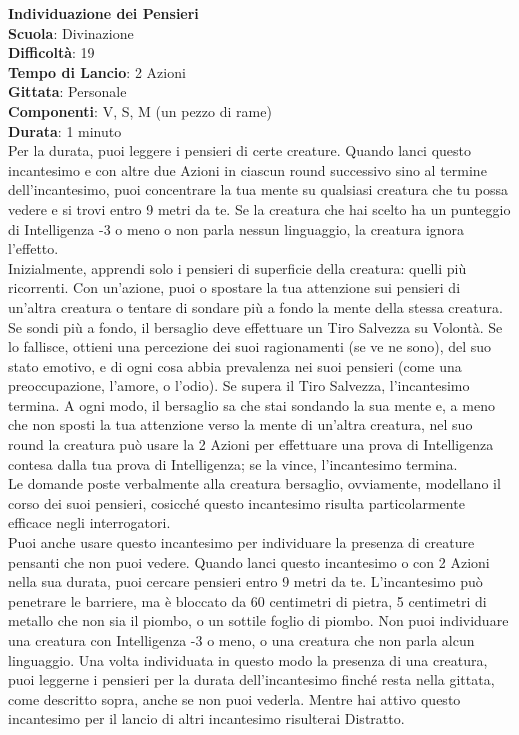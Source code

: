 \begin{multicols}{2}
\medskip\textbf{Individuazione dei Pensieri}\\
\textbf{Scuola}: Divinazione\\
\textbf{Difficoltà}: 19\\
\textbf{Tempo di Lancio}: 2 Azioni\\
\textbf{Gittata}: Personale\\
\textbf{Componenti}: V, S, M (un pezzo di rame)\\
\textbf{Durata}: 1 minuto\\
Per la durata, puoi leggere i pensieri di certe creature. Quando lanci questo incantesimo e con altre due Azioni in ciascun round successivo sino al termine dell'incantesimo, puoi concentrare la tua mente su qualsiasi creatura che tu possa vedere e si trovi entro 9 metri da te. Se la creatura che hai scelto ha un punteggio di Intelligenza -3 o meno o non parla nessun linguaggio, la creatura ignora l'effetto.\\
Inizialmente, apprendi solo i pensieri di superficie della creatura: quelli più ricorrenti. Con un'azione, puoi o spostare la tua attenzione sui pensieri di un'altra creatura o tentare di sondare più a fondo la mente della stessa creatura. Se sondi più a fondo, il bersaglio deve effettuare un Tiro Salvezza su Volontà. Se lo fallisce, ottieni una percezione dei suoi ragionamenti (se ve ne sono), del suo stato emotivo, e di ogni cosa abbia prevalenza nei suoi pensieri (come una preoccupazione, l'amore, o l'odio). Se supera il Tiro Salvezza, l'incantesimo termina. A ogni modo, il bersaglio sa che stai sondando la sua mente e, a meno che non sposti la tua attenzione verso la mente di un'altra creatura, nel suo round la creatura può usare la 2 Azioni per effettuare una prova di Intelligenza contesa dalla tua prova di Intelligenza; se la vince, l'incantesimo termina.\\
Le domande poste verbalmente alla creatura bersaglio, ovviamente, modellano il corso dei suoi pensieri, cosicché questo incantesimo risulta particolarmente efficace negli interrogatori.\\
Puoi anche usare questo incantesimo per individuare la presenza di creature pensanti che non puoi vedere. Quando lanci questo incantesimo o con 2 Azioni nella sua durata, puoi cercare pensieri entro 9 metri da te. L'incantesimo può penetrare le barriere, ma è bloccato da 60 centimetri di pietra, 5 centimetri di metallo che non sia il piombo, o un sottile foglio di piombo. Non puoi individuare una creatura con Intelligenza -3 o meno, o una creatura che non parla alcun linguaggio. Una volta individuata in questo modo la presenza di una creatura, puoi leggerne i pensieri per la durata dell'incantesimo finché resta nella gittata, come descritto sopra, anche se non puoi vederla.
Mentre hai attivo questo incantesimo per il lancio di altri incantesimo risulterai Distratto.


\end{multicols}
